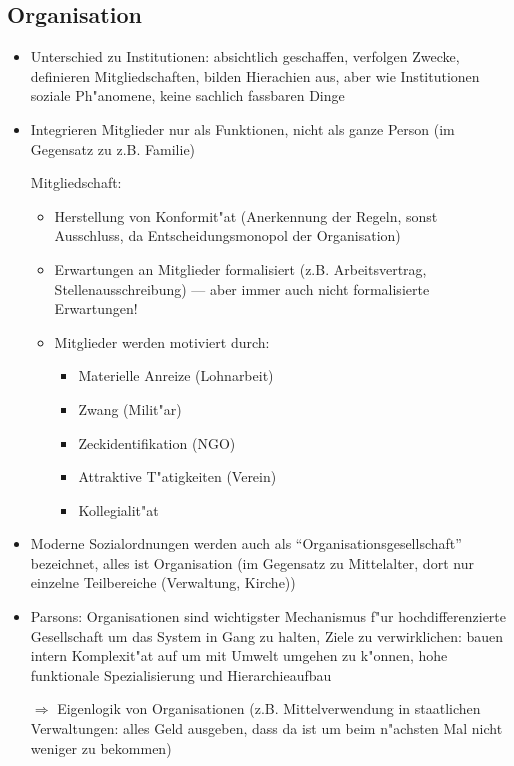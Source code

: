 \subsection{Organisation}
\begin{itemize}
	\item
		Unterschied zu Institutionen: absichtlich geschaffen, verfolgen Zwecke, definieren Mitgliedschaften, bilden Hierachien aus, aber wie Institutionen soziale Ph"anomene, keine sachlich fassbaren Dinge
	\item
		Integrieren Mitglieder nur als Funktionen, nicht als ganze Person (im Gegensatz zu z.B. Familie)

		Mitgliedschaft:
		\begin{itemize}
			\item
				Herstellung von Konformit"at (Anerkennung der Regeln, sonst Ausschluss, da Entscheidungsmonopol der Organisation)
			\item
				Erwartungen an Mitglieder formalisiert (z.B. Arbeitsvertrag, Stellenausschreibung) --- aber immer auch nicht formalisierte Erwartungen!
			\item
				Mitglieder werden motiviert durch:
				\begin{itemize}
					\item
						Materielle Anreize (Lohnarbeit)
					\item
						Zwang (Milit"ar)
					\item
						Zeckidentifikation (NGO)
					\item
						Attraktive T"atigkeiten (Verein)
					\item
						Kollegialit"at
				\end{itemize}
		\end{itemize}
	\item
		Moderne Sozialordnungen werden auch als \enquote{Organisationsgesellschaft} bezeichnet, alles ist Organisation (im Gegensatz zu Mittelalter, dort nur einzelne Teilbereiche (Verwaltung, Kirche))
	\item
		Parsons: Organisationen sind wichtigster Mechanismus f"ur hochdifferenzierte Gesellschaft um das System in Gang zu halten, Ziele zu verwirklichen: bauen intern Komplexit"at auf um mit Umwelt umgehen zu k"onnen, hohe funktionale Spezialisierung und Hierarchieaufbau

		$\Rightarrow$ Eigenlogik von Organisationen (z.B. Mittelverwendung in staatlichen Verwaltungen: alles Geld ausgeben, dass da ist um beim n"achsten Mal nicht weniger zu bekommen)

\end{itemize}
